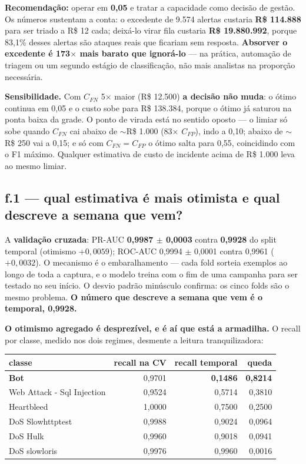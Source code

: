 \documentclass[10pt,a4paper]{article}
\newcommand{\resp}[1]{\subsection{#1}}
\begin{document}
\textbf{Recomendação:} operar em \textbf{0,05} e tratar a capacidade como decisão de gestão. Os
números sustentam a conta: o excedente de 9.574 alertas custaria \textbf{R\$ 114.888} para ser
triado a R\$ 12 cada; deixá-lo virar fila custaria \textbf{R\$ 19.880.992}, porque 83,1\% desses
alertas são ataques reais que ficariam sem resposta. \textbf{Absorver o excedente é
173$\times$ mais barato que ignorá-lo} --- na prática, automação de triagem ou um segundo
estágio de classificação, não mais analistas na proporção necessária.

\textbf{Sensibilidade.} Com $C_{FN}$ 5$\times$ maior (R\$ 12.500) \textbf{a decisão não muda}:
o ótimo continua em 0,05 e o custo sobe para R\$ 138.384, porque o ótimo já saturou na ponta
baixa da grade. O ponto de virada está no sentido oposto --- o limiar só sobe quando $C_{FN}$
cai abaixo de $\sim$R\$ 1.000 (83$\times$ $C_{FP}$), indo a 0,10; abaixo de $\sim$R\$ 250 vai a
0,15; e só com $C_{FN} = C_{FP}$ o ótimo salta para 0,55, coincidindo com o F1 máximo. Qualquer
estimativa de custo de incidente acima de R\$ 1.000 leva ao mesmo limiar.

\resp{f.1 --- qual estimativa é mais otimista e qual descreve a semana que vem?}

A \textbf{validação cruzada}: PR-AUC \textbf{0,9987 $\pm$ 0,0003} contra \textbf{0,9928} do
split temporal (otimismo $+0{,}0059$); ROC-AUC 0,9994 $\pm$ 0,0001 contra 0,9961
($+0{,}0032$). O mecanismo é o embaralhamento --- cada fold sorteia exemplos ao longo de toda a
captura, e o modelo treina com o fim de uma campanha para ser testado no seu início. O desvio
padrão minúsculo confirma: os cinco folds são o mesmo problema. \textbf{O número que descreve a
semana que vem é o temporal, 0,9928.}

\textbf{O otimismo agregado é desprezível, e é aí que está a armadilha.} O recall por classe,
medido nos dois regimes, desmente a leitura tranquilizadora:

\begin{center}\small
\begin{tabular}{lrrr}
\toprule
classe & recall na CV & recall temporal & queda\\
\midrule
\textbf{Bot} & 0,9701 & \textbf{0,1486} & \textbf{0,8214}\\
Web Attack - Sql Injection & 0,9524 & 0,5714 & 0,3810\\
Heartbleed & 1,0000 & 0,7500 & 0,2500\\
DoS Slowhttptest & 0,9988 & 0,9024 & 0,0964\\
DoS Hulk & 0,9960 & 0,9018 & 0,0941\\
DoS slowloris & 0,9976 & 0,9960 & 0,0016\\
\bottomrule
\end{tabular}
\end{center}
\end{document}
